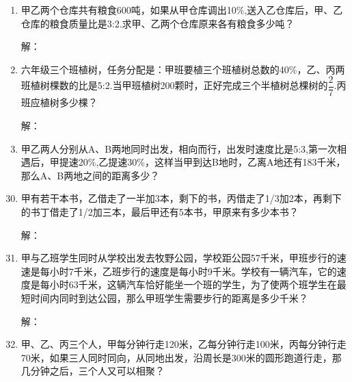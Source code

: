 \documentclass[onecolumn,landscape,UTF8]{ctexart}
\begin{document}
\begin{spacing}{1.3}
\begin{enumerate}
			\item 甲乙两个仓库共有粮食600吨，如果从甲仓库调出10\%,送入乙仓库后，甲、乙仓库的粮食质量比是3:2.求甲、乙两个仓库原来各有粮食多少吨？
			
           解：
            \vspace{3.5cm}

            \item 六年级三个班植树，任务分配是：甲班要植三个班植树总数的40\%，乙、丙两班植树棵数的比是5:2.当甲班植树200颗时，正好完成三个半植树总棵树的$\dfrac{2}{7}$.丙班应植树多少棵？

           解：
            \vspace{3.5cm}

            \item  甲乙两人分别从A、B两地同时出发，相向而行，出发时速度比是5:3,第一次相遇后，甲提速20\%,乙提速30\%，这样当甲到达B地时，乙离A地还有183千米，那么A、B两地之间的距离多少？
		\end{enumerate}
	

	\end{spacing}
\newpage

\begin{enumerate}\setcounter{enumi}{29}


			\item 甲有若干本书，乙借走了一半加3本，剩下的书，丙借走了1/3加2本，再剩下的书丁借走了1/2加三本，最后甲还有5本书，甲原来有多少本书？
			
           解：
            \vspace{3.5cm}

            \item 甲与乙班学生同时从学校出发去牧野公园，学校距公园57千米，甲班步行的速速是每小时7千米，乙班步行的速度是每小时9千米。学校有一辆汽车，它的速度是每小时63千米，这辆汽车恰好能坐一个班的学生，为了使两个班学生在最短时间内同时到达公园，那么甲班学生需要步行的距离是多少千米？

           解：
            \vspace{3.5cm}

            \item  甲、乙、丙三个人，甲每分钟行走120米，乙每分钟行走100米，丙每分钟行走70米，如果三人同时同向，从同地出发，沿周长是300米的圆形跑道行走，那几分钟之后，三个人又可以相聚？
		\end{enumerate}
	\clearpage
	
\end{document}
